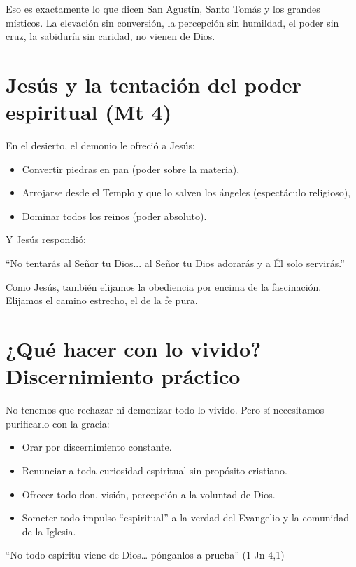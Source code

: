 \documentclass[12pt,a4paper]{article}
\begin{document}
Eso es exactamente lo que dicen San Agustín, Santo Tomás y los grandes místicos. La elevación sin conversión, la percepción sin humildad, el poder sin cruz, la sabiduría sin caridad, no vienen de Dios.

\section*{Jesús y la tentación del poder espiritual (Mt 4)}

En el desierto, el demonio le ofreció a Jesús:
\begin{itemize}
	\item Convertir piedras en pan (poder sobre la materia),
	\item Arrojarse desde el Templo y que lo salven los ángeles (espectáculo religioso),
	\item Dominar todos los reinos (poder absoluto).
\end{itemize}

Y Jesús respondió:

\begin{displayquote}
	“No tentarás al Señor tu Dios... al Señor tu Dios adorarás y a Él solo servirás.”
\end{displayquote}

Como Jesús, también elijamos la obediencia por encima de la fascinación. Elijamos el camino estrecho, el de la fe pura.

\section*{¿Qué hacer con lo vivido? Discernimiento práctico}

No tenemos que rechazar ni demonizar todo lo vivido. Pero sí necesitamos purificarlo con la gracia:
\begin{itemize}
	\item Orar por discernimiento constante.
	\item Renunciar a toda curiosidad espiritual sin propósito cristiano.
	\item Ofrecer todo don, visión, percepción a la voluntad de Dios.
	\item Someter todo impulso “espiritual” a la verdad del Evangelio y la comunidad de la Iglesia.
\end{itemize}

\begin{displayquote}
	“No todo espíritu viene de Dios… pónganlos a prueba” (1 Jn 4,1)
\end{displayquote}
\end{document}
